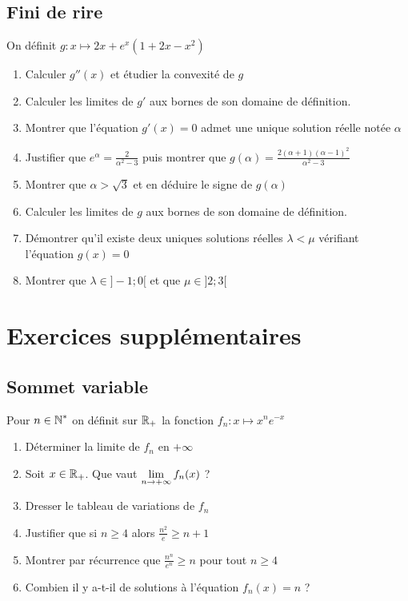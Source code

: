 \documentclass[oneside,12pt]{book}          %
\begin{document}
\subsection{Fini de rire}
On définit $g : x \mapsto 2x + e^x(1+2x-x^2)$
\begin{enumerate}
    \item Calculer $g''(x)$ et étudier la convexité de $g$
    \item Calculer les limites de $g'$ aux bornes de son domaine de définition.
    \item Montrer que l'équation $g'(x)=0$ admet une unique solution réelle notée $\alpha$
    \item Justifier que $e^\alpha=\frac{2}{\alpha^2-3}$ puis montrer que $g(\alpha)=\frac{2(\alpha+1)(\alpha-1)^2}{\alpha^2-3}$
    \item Montrer que $\alpha>\sqrt{3}$ et en déduire le signe de $g(\alpha)$
    \item Calculer les limites de $g$ aux bornes de son domaine de définition.
    \item Démontrer qu'il existe deux uniques solutions réelles $\lambda<\mu$ vérifiant l'équation $g(x)=0$
    \item Montrer que $\lambda\in]-1;0[$ et que $\mu\in]2;3[$
\end{enumerate}



\section{Exercices supplémentaires}

\subsection{Sommet variable}
Pour ${n\in\mathbb N}^*$ on définit sur ${\mathbb R}_+$ la fonction $f_n:x\mapsto x^ne^{-x}$
\begin{enumerate}
	\item Déterminer la limite de $f_n$ en $+\infty$
	\item Soit ${x\in\mathbb R}_+$. Que vaut ${\lim\limits_{n\to +\infty}}\, f_n(x)$ ?
	\item Dresser le tableau de variations de $f_n$
	\item Justifier que si $n\geq4$ alors $\frac{n^2}{e}\geq n+1$
	\item Montrer par récurrence que $\frac{n^n}{e^n}\geq n$ pour tout $n\geq4$
	\item Combien il y a-t-il de solutions à l'équation $f_n(x)=n$ ?
\end{enumerate}
\end{document}

